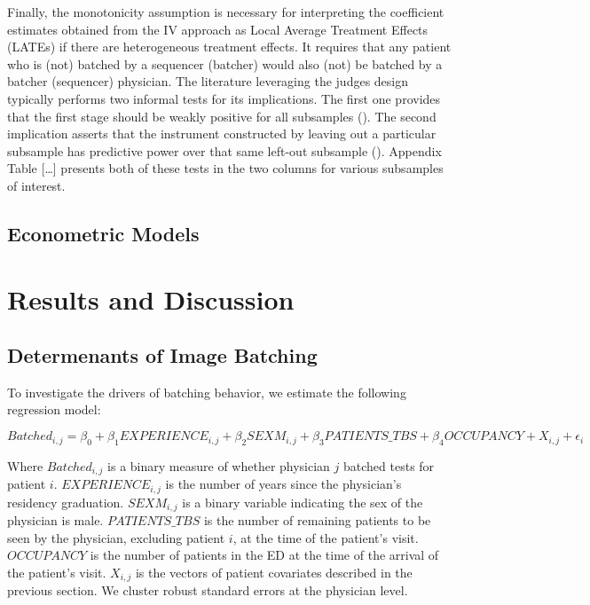 \documentclass[,mnsc,nonblindrev]{informs}
\begin{document}
Finally, the monotonicity assumption is necessary for interpreting the
coefficient estimates obtained from the IV approach as Local Average
Treatment Effects (LATEs) if there are heterogeneous treatment effects.
It requires that any patient who is (not) batched by a sequencer
(batcher) would also (not) be batched by a batcher (sequencer)
physician. The literature leveraging the judges design typically
performs two informal tests for its implications. The first one provides
that the first stage should be weakly positive for all subsamples
(\citet{dobbie2018effects}). The second implication asserts that the
instrument constructed by leaving out a particular subsample has
predictive power over that same left-out subsample
(\citet{bhuller2020incarceration}). Appendix Table {[}\ldots{]} presents
both of these tests in the two columns for various subsamples of
interest.

\hypertarget{econometric-models}{%
\subsection{Econometric Models}\label{econometric-models}}

\hypertarget{results-and-discussion}{%
\section{Results and Discussion}\label{results-and-discussion}}

\hypertarget{determenants-of-image-batching}{%
\subsection{Determenants of Image
Batching}\label{determenants-of-image-batching}}

To investigate the drivers of batching behavior, we estimate the
following regression model:

\small

\begin{equation}
Batched_{i,j} = \beta_0 + \beta_1 EXPERIENCE_{i,j} + \beta_2 SEXM_{i,j} + \beta_3 PATIENTS\_TBS + \beta_4 OCCUPANCY + X_{i,j} + \epsilon_i
\end{equation}

\normalsize

Where \(Batched_{i,j}\) is a binary measure of whether physician \(j\)
batched tests for patient \(i\). \(EXPERIENCE_{i,j}\) is the number of
years since the physician's residency graduation. \(SEXM_{i,j}\) is a
binary variable indicating the sex of the physician is male.
\(PATIENTS\_TBS\) is the number of remaining patients to be seen by the
physician, excluding patient \(i\), at the time of the patient's visit.
\(OCCUPANCY\) is the number of patients in the ED at the time of the
arrival of the patient's visit. \(X_{i,j}\) is the vectors of patient
covariates described in the previous section. We cluster robust standard
errors at the physician level.
\end{document}
